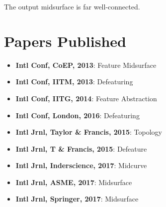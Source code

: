 The output midsurface is far well-connected.

%	
%
%
\vspace{-1em}

\section{Papers Published}
\begin{itemize}[noitemsep,nolistsep]
	\item \textbf{Intl Conf, CoEP, 2013}: Feature Midsurface
	\item \textbf{Intl Conf, IITM, 2013}: Defeaturing
	\item \textbf{Intl Conf, IITG, 2014}:  Feature Abstraction
	\item \textbf{Intl Conf, London, 2016}:  Defeaturing
	\item \textbf{Intl Jrnl, Taylor \& Francis, 2015}: Topology
	\item \textbf{Intl Jrnl, T \& Francis, 2015}: Defeature
	\item \textbf{Intl Jrnl, Inderscience, 2017}: Midcurve
	\item \textbf{Intl Jrnl, ASME, 2017}: Midsurface
	\item \textbf{Intl Jrnl, Springer, 2017}: Midsurface
\end{itemize} 

